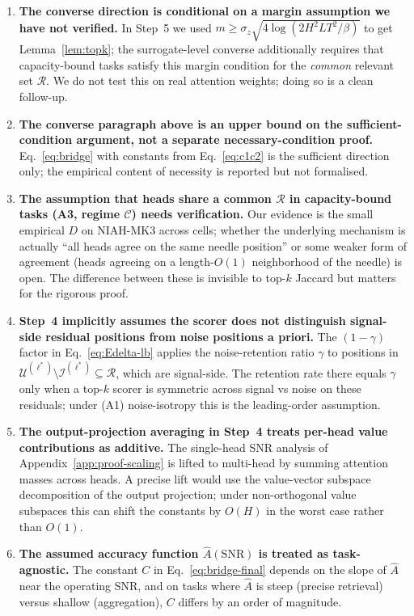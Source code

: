 \begin{enumerate}
  alternative for readers who reject the surrogate-level amplification
  argument.
  \item \textbf{The converse direction is conditional on a margin
  assumption we have not verified.} In Step~5 we used $m \geq \sigma_z
  \sqrt{4 \log(2 H^2 L T^2 / \beta)}$ to get Lemma~\ref{lem:topk}; the
  surrogate-level converse additionally requires that capacity-bound
  tasks satisfy this margin condition for the \emph{common} relevant
  set $\mathcal{R}$. We do not test this on real attention weights;
  doing so is a clean follow-up.
  \item \textbf{The converse paragraph above is an upper bound on the
  sufficient-condition argument, not a separate necessary-condition
  proof.} Eq.~\eqref{eq:bridge} with constants from
  Eq.~\eqref{eq:c1c2} is the sufficient direction only; the empirical
  content of necessity is reported but not formalised.
  \item \textbf{The assumption that heads share a common $\mathcal{R}$
  in capacity-bound tasks (A3, regime $\mathcal{C}$) needs verification.}
  Our evidence is the small empirical $D$ on NIAH-MK3 across cells;
  whether the underlying mechanism is actually ``all heads agree on the
  same needle position'' or some weaker form of agreement (heads
  agreeing on a length-$O(1)$ neighborhood of the needle) is open. The
  difference between these is invisible to top-$k$ Jaccard but matters
  for the rigorous proof.
  \item \textbf{Step~4 implicitly assumes the scorer does not
  distinguish signal-side residual positions from noise positions a
  priori.} The $(1 - \gamma)$ factor in Eq.~\eqref{eq:Edelta-lb} applies
  the noise-retention ratio $\gamma$ to positions in
  $\mathcal{U}^{(\ell^*)} \setminus \mathcal{I}^{(\ell^*)}
  \subseteq \mathcal{R}$, which are signal-side. The retention rate
  there equals $\gamma$ only when a top-$k$ scorer is symmetric across
  signal vs noise on these residuals; under (A1) noise-isotropy this is
  the leading-order assumption.
  \item \textbf{The output-projection averaging in Step~4 treats
  per-head value contributions as additive.} The single-head SNR
  analysis of Appendix~\ref{app:proof-scaling} is lifted to multi-head
  by summing attention masses across heads. A precise lift would use
  the value-vector subspace decomposition of the output projection;
  under non-orthogonal value subspaces this can shift the constants by
  $O(H)$ in the worst case rather than $O(1)$.
  \item \textbf{The assumed accuracy function $\hat A(\mathrm{SNR})$ is
  treated as task-agnostic.} The constant $C$ in Eq.~\eqref{eq:bridge-final}
  depends on the slope of $\hat A$ near the operating SNR, and on tasks where
  $\hat A$ is steep (precise retrieval) versus shallow (aggregation), $C$
  differs by an order of magnitude.
\end{enumerate}

